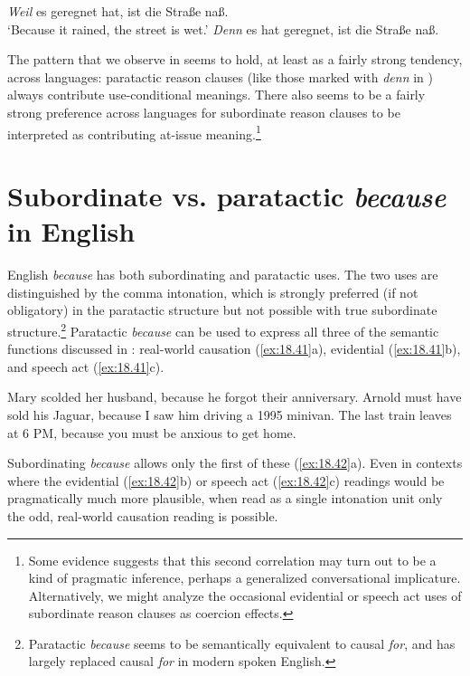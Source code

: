 \largerpage
\ea \label{ex:18.32}
\ea  \textit{Weil} es geregnet hat, ist die Straße naß.\\
\glt ‘Because it rained, the street is wet.’
\ex *\textit{Denn} es hat geregnet, ist die Straße naß.\\
\z \z


The pattern that we observe in  seems to hold, at least as a fairly strong tendency, across languages: paratactic reason clauses (like those marked with \textit{denn} in ) always contribute use-conditional meanings. There also seems to be a fairly strong preference across languages for subordinate reason clauses to be interpreted as contributing at-issue meaning.\footnote{Some evidence suggests that this second correlation may turn out to be a kind of pragmatic inference, perhaps a generalized conversational implicature. Alternatively, we might analyze the occasional evidential or speech act uses of subordinate reason clauses as coercion effects.}



\section{Subordinate vs. paratactic \textit{because} in English}\label{sec:18.4}


English \textit{because} has both subordinating and paratactic uses. The two uses are distinguished by the comma intonation, which is strongly preferred (if not obligatory) in the paratactic structure but not possible with true subordinate structure.\footnote{Paratactic \textit{because} seems to be semantically equivalent to causal \textit{for}, and has largely replaced causal \textit{for} in modern spoken English.}  Paratactic \textit{because} can be used to express all three of the semantic functions discussed in : real-world causation (\ref{ex:18.41}a), evidential (\ref{ex:18.41}b), and speech act (\ref{ex:18.41}c).


\ea \label{ex:18.41}
\ea  Mary scolded her husband, because he forgot their anniversary.
\ex Arnold must have sold his Jaguar, because I saw him driving a 1995 minivan.
\ex The last train leaves at 6 PM, because you must be anxious to get home.
                       \z
\z


Subordinating \textit{because} allows only the first of these (\ref{ex:18.42}a). Even in contexts where the evidential (\ref{ex:18.42}b) or speech act (\ref{ex:18.42}c) readings would be pragmatically much more plausible, when read as a single intonation unit only the odd, real-world causation reading is possible.


